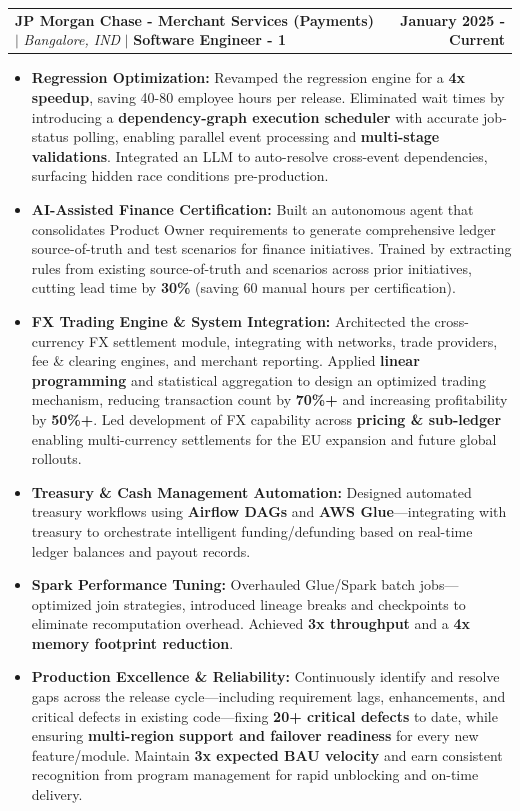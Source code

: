 \documentclass[10pt]{article}
\makeatletter
\newcommand{\resumeItem}[1]{
  \item\small{
    {#1 \vspace{-2pt}}
  }
}
\newcommand{\resumeProjectHeading}[2]{
    \item
    \begin{tabular*}{0.97\textwidth}{l@{\extracolsep{\fill}}r}
      \small#1 & #2 \\
    \end{tabular*}\vspace{-7 pt}
}
\newcommand{\resumeItemListStart}{\begin{itemize}[leftmargin=0.08in]}
\newcommand{\resumeItemListEnd}{\end{itemize}\vspace{-5 pt}}
\makeatother
\begin{document}
\resumeProjectHeading
{\textbf{JP Morgan Chase - Merchant Services (Payments)} $|$ \footnotesize\emph{Bangalore, IND} $|$ \textbf{Software Engineer - 1} \vspace{1pt}}{\textbf{January 2025 - Current}}
{\small{\resumeItemListStart
    \resumeItem{\textbf{Regression Optimization:} Revamped the regression engine for a \textbf{4x speedup}, saving 40-80 employee hours per release. Eliminated wait times by introducing a \textbf{dependency-graph execution scheduler} with accurate job-status polling, enabling parallel event processing and \textbf{multi-stage validations}. Integrated an LLM to auto-resolve cross-event dependencies, surfacing hidden race conditions pre-production.}

    \resumeItem{\textbf{AI-Assisted Finance Certification:} Built an autonomous agent that consolidates Product Owner requirements to generate comprehensive ledger source-of-truth and test scenarios for finance initiatives. Trained by extracting rules from existing source-of-truth and scenarios across prior initiatives, cutting lead time by \textbf{30\%} (saving 60 manual hours per certification).}

    \resumeItem{\textbf{FX Trading Engine \& System Integration:} Architected the cross-currency FX settlement module, integrating with networks, trade providers, fee \& clearing engines, and merchant reporting. Applied \textbf{linear programming} and statistical aggregation to design an optimized trading mechanism, reducing transaction count by \textbf{70\%+} and increasing profitability by \textbf{50\%+}. Led development of FX capability across \textbf{pricing \& sub-ledger} enabling multi-currency settlements for the EU expansion and future global rollouts.}

    \resumeItem{\textbf{Treasury \& Cash Management Automation:} Designed automated treasury workflows using \textbf{Airflow DAGs} and \textbf{AWS Glue}—integrating with treasury to orchestrate intelligent funding/defunding based on real-time ledger balances and payout records.}

    \resumeItem{\textbf{Spark Performance Tuning:} Overhauled Glue/Spark batch jobs—optimized join strategies, introduced lineage breaks and checkpoints to eliminate recomputation overhead. Achieved \textbf{3x throughput} and a \textbf{4x memory footprint reduction}.}

    \resumeItem{\textbf{Production Excellence \& Reliability:} Continuously identify and resolve gaps across the release cycle—including requirement lags, enhancements, and critical defects in existing code—fixing \textbf{20+ critical defects} to date, while ensuring \textbf{multi-region support and failover readiness} for every new feature/module. Maintain \textbf{3x expected BAU velocity} and earn consistent recognition from program management for rapid unblocking and on-time delivery.}
    \resumeItemListEnd
  }}
\end{document}
